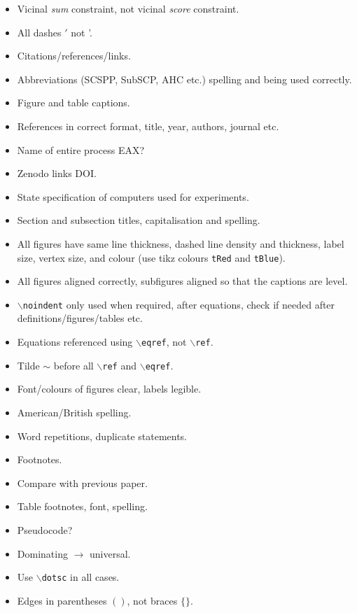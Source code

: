 \documentclass{elsarticle}
\begin{document}
{\color{myAqua}
\begin{itemize}[leftmargin=*]
	\item Vicinal \emph{sum} constraint, not vicinal \emph{score} constraint.
	\item All dashes $'$ not '. 
	\item Citations/references/links.
	\item Abbreviations (SCSPP, SubSCP, AHC etc.) spelling and being used correctly.
	\item Figure and table captions.
	\item References in correct format, title, year, authors, journal etc.
	\item Name of entire process EAX?
	\item Zenodo links DOI.
	\item State specification of computers used for experiments.
	\item Section and subsection titles, capitalisation and spelling.
	\item All figures have same line thickness, dashed line density and thickness, label size, vertex size, and colour (use tikz colours \texttt{tRed} and \texttt{tBlue}).
	\item All figures aligned correctly, subfigures aligned so that the captions are level.
	\item \texttt{$\backslash$noindent} only used when required, after equations, check if needed after definitions/figures/tables etc.
	\item Equations referenced using \texttt{$\backslash$eqref}, not \texttt{$\backslash$ref}.
	\item Tilde $\sim$ before all \texttt{$\backslash$ref} and \texttt{$\backslash$eqref}.
	\item Font/colours of figures clear, labels legible.
	\item American/British spelling.
	\item Word repetitions, duplicate statements.
	\item Footnotes.
	\item Compare with previous paper.
	\item Table footnotes, font, spelling.
	\item Pseudocode?
	\item Dominating $\to$ universal.
	\item Use \texttt{$\backslash$dotsc} in all cases.
	\item Edges in parentheses $()$, not braces $\{\}$.
\end{itemize}		
}



\end{document}
